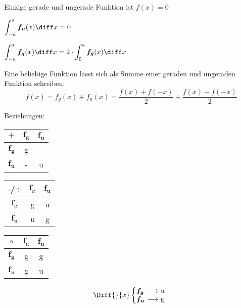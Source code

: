 	\begin{regeln}
		\begin{tightitemize}
			\item Einzige gerade und ungerade Funktion ist $f(x) = 0$
			
			\item $\displaystyle
				\int_{-a}^a \boldsymbol{f_u}(x) \diff x = 0
			$
			\item $\displaystyle
				\int_{-a}^a \boldsymbol{f_g}(x) \diff x = 2\cdot \int_0^a \boldsymbol{f_g}(x) \diff x
			$
			
			\item Eine beliebige Funktion lässt sich als Summe einer geraden und ungeraden Funktion schreiben:\[
				f(x) = f_g(x) + f_u(x) = \frac{f(x)+f(-x)}{2} + \frac{f(x)-f(-x)}{2}
			\]
			
			\item Beziehungen:
		\end{tightitemize}
		\begin{multicols}{2}
			\begin{center}
				\begin{tabular}{c|cc}
					$\boldsymbol+$&$\boldsymbol {f_g}$&$\boldsymbol {f_u}$\\
					\midrule
					$\boldsymbol {f_g}$&g&-\\
					$\boldsymbol {f_u}$&-&u\\
				\end{tabular}
			\end{center}
			
			\begin{center}
				\begin{tabular}{c|cc}
					$\boldsymbol\cdot$/$\boldsymbol\div$&$\boldsymbol {f_g}$&$\boldsymbol {f_u}$\\
					\midrule
					$\boldsymbol {f_g}$&g&u\\
					$\boldsymbol {f_u}$&u&g\\
				\end{tabular}
			\end{center}
			
			\begin{center}
				\begin{tabular}{c|cc}
					$\boldsymbol\circ$&$\boldsymbol {f_g}$&$\boldsymbol {f_u}$\\
					\midrule
					$\boldsymbol {f_g}$&g&g\\
					$\boldsymbol {f_u}$&g&u\\
				\end{tabular}
			\end{center}
			
			\begin{center}
				\[
					\Diff{}{x} \left\{\begin{array}{@{}l@{\ \longrightarrow\ }l}
						\boldsymbol{f_g} & \text{u} \\
						\boldsymbol{f_u} & \text{g}
					\end{array}\right.
				\]
			\end{center}
		\end{multicols}
	\end{regeln}

